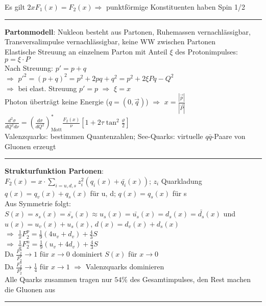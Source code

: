 \documentclass[10pt,twoside,a4paper]{article}
\begin{document}
\begin{multicols*}{3}
Es gilt $2 x F_1(x) = F_2(x) \Rightarrow$ punktförmige Konstituenten haben Spin 1/2
\\ \rule[0ex]{\columnwidth}{0.5pt}
\textbf{Partonmodell}: Nukleon besteht aus Partonen, Ruhemassen vernachlässigbar, Transversalimpulse vernachlässigbar, keine WW zwischen Partonen \\
Elastische Streuung an einzelnem Parton mit Anteil $\xi$ des Protonimpulses: $p = \xi \cdot P$ \\
Nach Streuung: $p' = p + q$ \\
$\Rightarrow$ $p'^2 = (p + q)^2 = p^2 + 2 p q + q^2 = p^2 + 2 \xi P q - Q^2$ \\
$\Rightarrow$ bei elast. Streuung $p' = p$ $\Rightarrow$ $\xi = x$ \\
Photon überträgt keine Energie ($q = (0,\vec{q})$) $\Rightarrow$ $x = \frac{|\vec{p}|}{|\vec{P}|}$ \\
$\frac{d^2\sigma}{dQ^2 d\nu} = \left( \frac{d\sigma}{dQ^2} \right)^*_{\text{Mott}} \frac{F_2(x)}{\nu} \left[ 1 + 2\tau \tan^2 \frac{\vartheta}{2} \right]$ \\
Valenzquarks: bestimmen Quantenzahlen; See-Quarks: virtuelle $q\bar{q}$-Paare von Gluonen erzeugt
\\ \rule[0ex]{\columnwidth}{0.5pt}
\textbf{Strukturfunktion Partonen}: \\
$F_2(x) = x \cdot \sum_{i=u,d,s} z^2_i (q_i(x) + \bar{q_i}(x))$; $z_i$ Quarkladung \\
$q(x) = q_v(x) + q_s(x)$ für u, d; $q(x) = q_s(x)$ für s \\
Aus Symmetrie folgt: $S(x) = s_s(x) = \bar{s_s}(x) \approx u_s(x) = \bar{u_s}(x) = d_s(x) = \bar{d_s}(x)$ und \\
$u(x) = u_v(x) + u_s(x)$, $d(x) = d_v(x) + d_s(x)$ \\
$\Rightarrow$ $\frac{1}{x} F^p_2 = \frac{1}{9} (4 u_v + d_v) + \frac{4}{3} S$ \\
$\Rightarrow$ $\frac{1}{x} F^n_2 = \frac{1}{9} (u_v + 4 d_v) + \frac{4}{3} S$ \\
Da $\frac{F^n_2}{F^p_2} \to 1$ für $x \to 0$ dominiert $S(x)$ für $x \to 0$ \\
Da $\frac{F^n_2}{F^p_2} \to \frac{1}{4}$ für $x \to 1$ $\Rightarrow$ Valenzquarks dominieren \\
Alle Quarks zusammen tragen nur $54\%$ des Gesamtimpulses, den Rest machen die Gluonen aus
\\ \rule[0ex]{\columnwidth}{0.5pt}

\end{multicols*}
\end{document}
